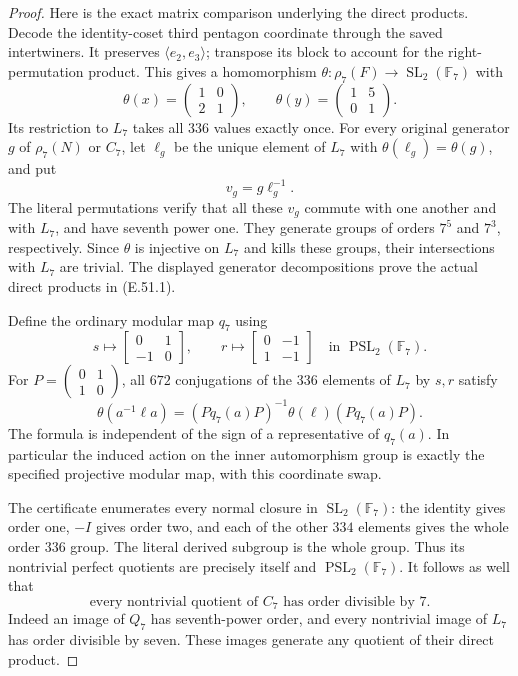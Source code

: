 \begin{proof}
Here is the exact matrix comparison underlying the direct
products.  Decode the identity-coset third pentagon
coordinate through the saved intertwiners.  It preserves
$\langle e_2,e_3\rangle$; transpose its block to account for
the right-permutation product.  This gives a homomorphism
$\theta:\rho_7(F)\to\operatorname{SL}_2(\mathbb F_7)$ with
\[
 \theta(x)=\begin{pmatrix}1&0\\2&1\end{pmatrix},
 \qquad\theta(y)=\begin{pmatrix}1&5\\0&1\end{pmatrix}.
\tag{E.51.9}
\]
Its restriction to $L_7$ takes all $336$ values exactly
once.  For every original generator $g$ of $\rho_7(N)$ or
$C_7$, let $\ell_g$ be the unique element of $L_7$ with
$\theta(\ell_g)=\theta(g)$, and put
\[
                         v_g=g\ell_g^{-1}.
\tag{E.51.10}
\]
The literal permutations verify that all these $v_g$
commute with one another and with $L_7$, and have seventh
power one.  They generate groups of orders $7^5$ and $7^3$,
respectively.  Since $\theta$ is injective on $L_7$ and
kills these groups, their intersections with $L_7$ are
trivial.  The displayed generator decompositions prove
the actual direct products in \textup{(E.51.1)}.

Define the ordinary modular map $q_7$ using
\[
 s\longmapsto\begin{bmatrix}0&1\\-1&0\end{bmatrix},\qquad
 r\longmapsto\begin{bmatrix}0&-1\\1&-1\end{bmatrix}
             \quad\text{in }\operatorname{PSL}_2(\mathbb F_7).
\tag{E.51.11}
\]
For $P=\left(\begin{smallmatrix}0&1\\1&0\end{smallmatrix}\right)$,
all $672$ conjugations of the $336$ elements of $L_7$ by
$s,r$ satisfy
\[
 \theta(a^{-1}\ell a)
       =(Pq_7(a)P)^{-1}\theta(\ell)(Pq_7(a)P).
\tag{E.51.12}
\]
The formula is independent of the sign of a representative
of $q_7(a)$.  In particular the induced action on the
inner automorphism group is exactly the specified
projective modular map, with this coordinate swap.

The certificate enumerates every normal closure in
$\operatorname{SL}_2(\mathbb F_7)$: the identity gives
order one, $-I$ gives order two, and each of the other
$334$ elements gives the whole order $336$ group.
The literal derived subgroup is the whole group.
Thus its nontrivial perfect quotients are precisely
itself and $\operatorname{PSL}_2(\mathbb F_7)$.
It follows as well that
\[
 \text{every nontrivial quotient of }C_7
                    \text{ has order divisible by }7.
\tag{E.51.13}
\]
Indeed an image of $Q_7$ has seventh-power order, and
every nontrivial image of $L_7$ has order divisible by
seven.  These images generate any quotient of their
direct product.


\end{proof}

